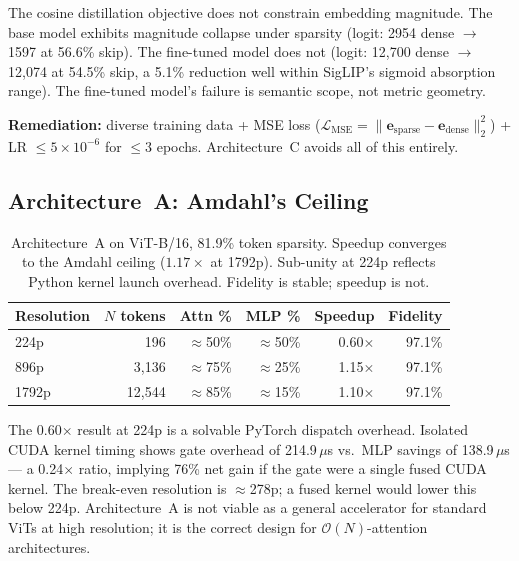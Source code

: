\documentclass{article}
\begin{document}
The cosine distillation objective does not constrain embedding magnitude.
The base model exhibits magnitude collapse under sparsity (logit: 2954
dense $\to$ 1597 at 56.6\% skip). The fine-tuned model does not (logit:
12{,}700 dense $\to$ 12{,}074 at 54.5\% skip, a 5.1\% reduction well
within SigLIP's sigmoid absorption range). The fine-tuned model's failure
is semantic scope, not metric geometry.

\textbf{Remediation:} diverse training data + MSE loss
($\mathcal{L}_{\text{MSE}} = \|\mathbf{e}_{\text{sparse}} - \mathbf{e}_{\text{dense}}\|_2^2$)
+ LR $\leq 5{\times}10^{-6}$ for $\leq 3$ epochs.
Architecture~C avoids all of this entirely.

\subsection{Architecture~A: Amdahl's Ceiling}
\label{sec:architecture-a-amdahls-ceiling}

\begin{table}[ht]
\centering
\begin{tabular}{lrrrrr}
\toprule
\textbf{Resolution} & \textbf{$N$ tokens} & \textbf{Attn \%} & \textbf{MLP \%}
                    & \textbf{Speedup} & \textbf{Fidelity} \\
\midrule
224p  &      196 & $\approx$50\% & $\approx$50\% & 0.60$\times$ & 97.1\% \\
896p  &    3{,}136 & $\approx$75\% & $\approx$25\% & 1.15$\times$ & 97.1\% \\
1792p & 12{,}544 & $\approx$85\% & $\approx$15\% & 1.10$\times$ & 97.1\% \\
\bottomrule
\end{tabular}
\caption{Architecture~A on ViT-B/16, 81.9\% token sparsity. Speedup
converges to the Amdahl ceiling ($1.17\times$ at 1792p). Sub-unity at
224p reflects Python kernel launch overhead. Fidelity is stable; speedup
is not.}
\label{tab:arch_a}
\end{table}

The 0.60$\times$ result at 224p is a solvable PyTorch dispatch overhead.
Isolated CUDA kernel timing shows gate overhead of 214.9\,$\mu$s
vs.\ MLP savings of 138.9\,$\mu$s — a 0.24$\times$ ratio, implying 76\%
net gain if the gate were a single fused CUDA kernel. The break-even
resolution is $\approx$278p; a fused kernel would lower this below 224p.
Architecture~A is not viable as a general accelerator for standard ViTs
at high resolution; it is the correct design for $\mathcal{O}(N)$-attention
architectures.
\end{document}
